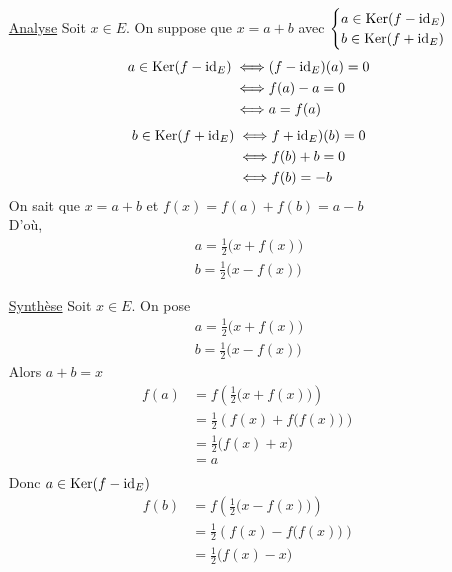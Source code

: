 \begin{prv}
	\begin{itemize}
		\item[\underline{\sc Analyse}] Soit $x \in E$. On suppose que $x = a + b$ avec $\begin{cases}
				a \in \operatorname{Ker}(f - \operatorname{id}_E)\\
				b \in \operatorname{Ker}(f + \operatorname{id}_E)
			\end{cases}$\\
			\begin{align*}
				a \in \operatorname{Ker}(f - \operatorname{id}_E) \iff& (f - \operatorname{id}_E)(a) = 0\\
				\iff& f(a) - a = 0\\
				\iff& a = f(a)
			\end{align*}
			\begin{align*}
				b \in \operatorname{Ker}(f + \operatorname{id}_E) \iff& f+\operatorname{id}_E)(b) = 0\\
				\iff& f(b) + b = 0\\
				\iff& f(b) = -b
			\end{align*}
			On sait que $x = a+b$ et $f(x) = f(a) + f(b) = a - b$ \\
			D'où,
			\begin{align*}
				a = \frac{1}{2}\big(x + f(x)\big)\\
				b = \frac{1}{2} \big(x - f(x)\big)
			\end{align*}
		\item[\underline{\sc Synthèse}] Soit $x \in E$. On pose
			\begin{align*}
				a = \frac{1}{2}\big(x + f(x)\big)\\
				b = \frac{1}{2}\big(x - f(x)\big)
			\end{align*}
			Alors $a+b = x$\\
			\begin{align*}
				f(a) &= f\left( \frac{1}{2}\big(x + f(x)\big) \right)\\
				&=\frac{1}{2}\left( f(x) + f\big(f(x)\big) \right)\\
				&= \frac{1}{2}\big(f(x) + x\big) \\
				&= a \\
			\end{align*}
			Donc $a \in \operatorname{Ker}(f - \operatorname{id}_E)$ 
			\begin{align*}
				f(b) &= f\left( \frac{1}{2}\big(x - f(x)\big) \right)\\
				&= \frac{1}{2}\left( f(x) - f\big(f(x)\big)  \right)  \\
				&= \frac{1}{2}\big(f(x) - x\big) \\

\end{align*}
\end{itemize}
\end{prv}

